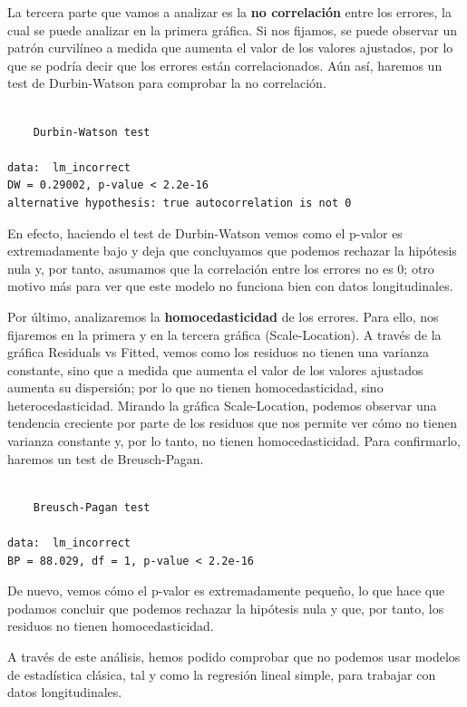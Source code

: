 \documentclass[
  letterpaper,
  DIV=11,
  numbers=noendperiod]{scrreprt}
\begin{document}
La tercera parte que vamos a analizar es la \textbf{no correlación}
entre los errores, la cual se puede analizar en la primera gráfica. Si
nos fijamos, se puede observar un patrón curvilíneo a medida que aumenta
el valor de los valores ajustados, por lo que se podría decir que los
errores están correlacionados. Aún así, haremos un test de Durbin-Watson
para comprobar la no correlación.

\begin{verbatim}

    Durbin-Watson test

data:  lm_incorrect
DW = 0.29002, p-value < 2.2e-16
alternative hypothesis: true autocorrelation is not 0
\end{verbatim}

En efecto, haciendo el test de Durbin-Watson vemos como el p-valor es
extremadamente bajo y deja que concluyamos que podemos rechazar la
hipótesis nula y, por tanto, asumamos que la correlación entre los
errores no es 0; otro motivo más para ver que este modelo no funciona
bien con datos longitudinales.

Por último, analizaremos la \textbf{homocedasticidad} de los errores.
Para ello, nos fijaremos en la primera y en la tercera gráfica
(Scale-Location). A través de la gráfica Residuals vs Fitted, vemos como
los residuos no tienen una varianza constante, sino que a medida que
aumenta el valor de los valores ajustados aumenta su dispersión; por lo
que no tienen homocedasticidad, sino heterocedasticidad. Mirando la
gráfica Scale-Location, podemos observar una tendencia creciente por
parte de los residuos que nos permite ver cómo no tienen varianza
constante y, por lo tanto, no tienen homocedasticidad. Para confirmarlo,
haremos un test de Breusch-Pagan.

\begin{verbatim}

    Breusch-Pagan test

data:  lm_incorrect
BP = 88.029, df = 1, p-value < 2.2e-16
\end{verbatim}

De nuevo, vemos cómo el p-valor es extremadamente pequeño, lo que hace
que podamos concluir que podemos rechazar la hipótesis nula y que, por
tanto, los residuos no tienen homocedasticidad.

A través de este análisis, hemos podido comprobar que no podemos usar
modelos de estadística clásica, tal y como la regresión lineal simple,
para trabajar con datos longitudinales.
\end{document}
